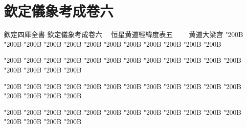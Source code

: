 \chapter*{欽定儀象考成卷六}
\begin{正文}
欽定四庫全書
欽定儀象考成卷六
　恒星黄道經緯度表五
　　黄道大梁宫
\char"200B\relax{}
\char"200B\relax{}
\char"200B\relax{}
\char"200B\relax{}
\char"200B\relax{}
\char"200B\relax{}
\char"200B\relax{}
\char"200B\relax{}
\char"200B\relax{}
\char"200B\relax{}
\char"200B\relax{}
\char"200B\relax
\par
\end{正文}\clearpage
{}
\begin{正文}
\char"200B\relax{}
\char"200B\relax{}
\char"200B\relax{}
\char"200B\relax{}
\char"200B\relax{}
\char"200B\relax{}
\char"200B\relax{}
\char"200B\relax{}
\char"200B\relax{}
\char"200B\relax{}
\char"200B\relax{}
\char"200B\relax{}
\char"200B\relax{}
\char"200B\relax{}
\char"200B\relax{}
\char"200B\relax
{}\par
\end{正文}\clearpage
{}
\begin{正文}
\char"200B\relax{}
\char"200B\relax{}
\char"200B\relax{}
\char"200B\relax{}
\char"200B\relax{}
\char"200B\relax{}
\char"200B\relax{}
\char"200B\relax{}
\char"200B\relax{}
\char"200B\relax{}
\char"200B\relax{}
\char"200B\relax{}
\char"200B\relax{}
\char"200B\relax{}
\char"200B\relax{}
\char"200B\relax
{}\par
\end{正文}\clearpage
{}
\begin{正文}
\char"200B\relax{}
\char"200B\relax{}
\char"200B\relax{}
\char"200B\relax{}
\char"200B\relax{}
\char"200B\relax{}
\char"200B\relax{}
\char"200B\relax{}
\char"200B\relax{}
\char"200B\relax{}
\char"200B\relax{}
\char"200B\relax{}
\char"200B\relax{}
\char"200B\relax{}
\char"200B\relax{}
\char"200B\relax
{}\par
\end{正文}\clearpage
